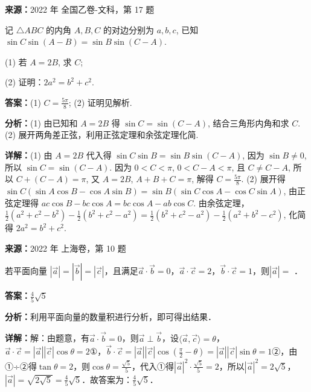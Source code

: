 \begin{question}[points=12]
\textbf{来源：}2022 年 全国乙卷-文科，第 17 题\par
记 $\triangle ABC$ 的内角 $A,B,C$ 的对边分别为 $a,b,c$, 已知 $\sin C \sin(A-B) = \sin B \sin(C-A)$.

(1) 若 $A=2B$, 求 $C$;

(2) 证明：$2a^2 = b^2 + c^2$.
\begin{solution}
\textbf{答案：}(1) $C = \frac{5\pi}{8}$; (2) 证明见解析.

\textbf{分析：}(1) 由已知和 $A=2B$ 得 $\sin C = \sin(C-A)$, 结合三角形内角和求 $C$.
(2) 展开两角差正弦，利用正弦定理和余弦定理化简.

\textbf{详解：}(1) 由 $A=2B$ 代入得 $\sin C\sin B = \sin B\sin(C-A)$, 因为 $\sin B\neq0$, 所以 $\sin C = \sin(C-A)$. 因为 $0<C<\pi$, $0<C-A<\pi$, 且 $C\neq C-A$, 所以 $C+(C-A)=\pi$, 又 $A=2B$, $A+B+C=\pi$, 解得 $C=\frac{5\pi}{8}$.
(2) 展开得 $\sin C(\sin A\cos B-\cos A\sin B) = \sin B(\sin C\cos A-\cos C\sin A)$, 由正弦定理得 $ac\cos B - bc\cos A = bc\cos A - ab\cos C$. 由余弦定理，$\frac12(a^2+c^2-b^2)-\frac12(b^2+c^2-a^2) = \frac12(b^2+c^2-a^2)-\frac12(a^2+b^2-c^2)$, 化简得 $2a^2=b^2+c^2$.
\end{solution}
\end{question}

\begin{question}[points=5]
\textbf{来源：}2022 年 上海卷，第 10 题\par
若平面向量 $|\vec{a}|=|\vec{b}|=|\vec{c}|$，且满足$\vec{a}\cdot\vec{b}=0$，$\vec{a}\cdot\vec{c}=2$，$\vec{b}\cdot\vec{c}=1$，则$|\vec{a}|=$ ．
\begin{solution}
\textbf{答案：}$\frac{4}{5}\sqrt{5}$

\textbf{分析：}利用平面向量的数量积进行分析，即可得出结果．

\textbf{详解：}解：由题意，有$\vec{a}\cdot\vec{b}=0$，则$\vec{a}\perp\vec{b}$，设$\langle\vec{a},\vec{c}\rangle=\theta$，$\vec{a}\cdot\vec{c}=|\vec{a}||\vec{c}|\cos\theta=2$①，$\vec{b}\cdot\vec{c}=|\vec{a}||\vec{c}|\cos(\frac{\pi}{2}-\theta)=|\vec{a}||\vec{c}|\sin\theta=1$②，由①÷②得$\tan\theta=2$，则$\cos\theta=\frac{\sqrt{5}}{5}$，代入①得$|\vec{a}|^2\cdot\frac{\sqrt{5}}{5}=2$，所以$|\vec{a}|^2=2\sqrt{5}$，$|\vec{a}|=\sqrt{2\sqrt{5}}=\frac{4}{5}\sqrt{5}$．故答案为：$\frac{4}{5}\sqrt{5}$．
\end{solution}
\end{question}

